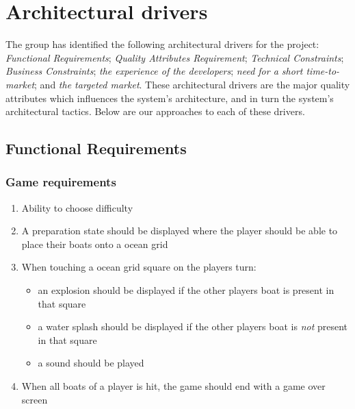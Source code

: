\chapter{Architectural drivers}
The group has identified the following architectural drivers for the project: \emph{Functional Requirements}; \emph{Quality Attributes Requirement}; \emph{Technical Constraints}; \emph{Business Constraints}; \emph{the experience of the developers}; \emph{need for a short time-to-market}; and \emph{the targeted market}. These architectural drivers are the major quality attributes which influences the system's architecture, and in turn the system's architectural tactics\cite{pensum}. Below are our approaches to each of these drivers.



	\section{Functional Requirements}
		\subsection{Game requirements}
		\begin{enumerate}
			\item Ability to choose difficulty
			\item A preparation state should be displayed where the player should be able to place their boats onto a ocean grid
			\item When touching a ocean grid square on the players turn:
				\begin{itemize}
					\item an explosion should be displayed if the other players boat is present in that square
					\item a water splash should be displayed if the other players boat is \emph{not} present in that square
					\item a sound should be played
				\end{itemize}
			\item When all boats of a player is hit, the game should end with a game over screen
		\end{enumerate}



